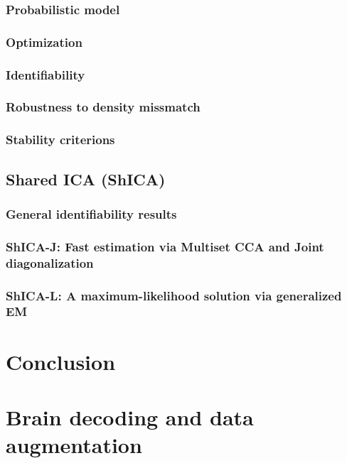 \documentclass[12pt]{report}
\begin{document}
\subsection{Probabilistic model}
\subsection{Optimization}
\subsection{Identifiability}
\subsection{Robustness to density missmatch}
\subsection{Stability criterions}
\section{Shared ICA (ShICA)}
\subsection{General identifiability results}
\subsection{ShICA-J: Fast estimation via Multiset CCA and Joint diagonalization}
\subsection{ShICA-L: A maximum-likelihood solution via generalized EM}

\chapter{Conclusion}

\appendix
\chapter{Brain decoding and data augmentation}
\end{document}
